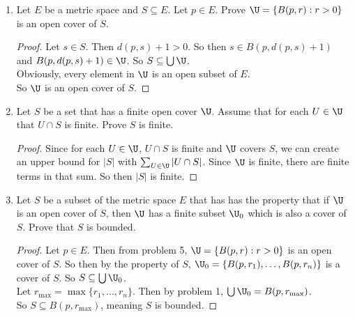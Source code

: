 \documentclass[14pt]{extarticle}
\begin{document}
\begin{enumerate}
		\item Let $E$ be a metric space and $S \subseteq E$. Let $p \in E$. Prove $\U = \{B(p, r) : r > 0\}$ is an open cover of $S$.
		\begin{proof}
			Let $s \in S$. Then $d(p,s)+1 > 0$. So then $s \in B(p,d(p,s)+1)$ and $B(p,d(p,s)+1) \in \U$. So $S \subseteq \bigcup\U$.\\
			Obviously, every element in $\U$ is an open subset of $E$.\\
			So $\U$ is an open cover of $S$.
		\end{proof}
		
		\item Let $S$ be a set that has a finite open cover $\U$. Assume that for each $U \in \U$ that $U \cap S$ is finite. Prove $S$ is finite.
		\begin{proof}
			Since for each $U \in \U$, $U \cap S$ is finite and $\U$ covers $S$, we can create an upper bound for $|S|$ with $\sum_{U\in\U} |U \cap S|$. Since $\U$ is finite, there are finite terms in that sum. So then $|S|$ is finite.
		\end{proof}
		
		\item Let $S$ be a subset of the metric space $E$ that has has the
		property that if $\U$ is an open cover of $S$, then $\U$ has a finite subset $\U_0$ which is also a cover of $S$. Prove that $S$ is bounded.
		\begin{proof}
			Let $p \in E$. Then from problem 5, $\U = \{B(p,r):r>0\}$ is an open cover of $S$. So then by the property of $S$, $\U_0 = \{B(p,r_1),\ldots,B(p,r_n)\}$ is a cover of $S$. So $S \subseteq \bigcup\U_0$.\\
			Let $r_{\max} = \max\{r_1,\ldots,r_n\}$. Then by problem 1, $\bigcup\U_0 = B(p,r_{\max})$.\\
			So $S \subseteq B(p,r_{\max})$, meaning $S$ is bounded.
		\end{proof}
	\end{enumerate}
\end{document}
